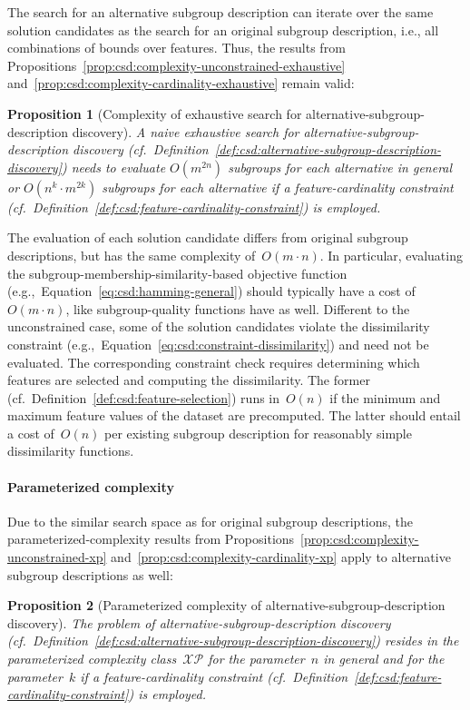 \documentclass{article}
\newtheorem{proposition}{Proposition}
\theoremstyle{definition}
\begin{document}
The search for an alternative subgroup description can iterate over the same solution candidates as the search for an original subgroup description, i.e., all combinations of bounds over features.
Thus, the results from Propositions~\ref{prop:csd:complexity-unconstrained-exhaustive} and~\ref{prop:csd:complexity-cardinality-exhaustive} remain valid:
%
\begin{proposition}[Complexity of exhaustive search for alternative-subgroup-description discovery]
	A naive exhaustive search for alternative-subgroup-descrip\-tion discovery (cf.~Definition~\ref{def:csd:alternative-subgroup-description-discovery})
	needs to evaluate $O(m^{2n})$ subgroups for each alternative in general or $O(n^k \cdot m^{2k})$ subgroups for each alternative if a feature-cardinality constraint (cf.~Definition~\ref{def:csd:feature-cardinality-constraint}) is employed.
	\label{prop:csd:complexity-alternatives-exhaustive}
\end{proposition}
%
The evaluation of each solution candidate differs from original subgroup descriptions, but has the same complexity of~$O(m \cdot n)$.
In particular, evaluating the subgroup-membership-similarity-based objective function (e.g.,~Equation~\ref{eq:csd:hamming-general}) should typically have a cost of~$O(m \cdot n)$, like subgroup-quality functions have as well.
Different to the unconstrained case, some of the solution candidates violate the dissimilarity constraint (e.g.,~Equation~\ref{eq:csd:constraint-dissimilarity}) and need not be evaluated.
The corresponding constraint check requires determining which features are selected and computing the dissimilarity.
The former (cf.~Definition~\ref{def:csd:feature-selection}) runs in~$O(n)$ if the minimum and maximum feature values of the dataset are precomputed.
The latter should entail a cost of~$O(n)$ per existing subgroup description for reasonably simple dissimilarity functions.

\paragraph{Parameterized complexity}

Due to the similar search space as for original subgroup descriptions, the parameterized-complexity results from Propositions~\ref{prop:csd:complexity-unconstrained-xp} and~\ref{prop:csd:complexity-cardinality-xp} apply to alternative subgroup descriptions as well:
\begin{proposition}[Parameterized complexity of alternative-subgroup-description discovery]
	The problem of alternative-subgroup-description discovery (cf.~Definition~\ref{def:csd:alternative-subgroup-description-discovery}) resides in the parameterized complexity class~$\mathcal{XP}$ for the parameter~$n$ in general and for the parameter~$k$ if a feature-cardinality constraint (cf.~Definition~\ref{def:csd:feature-cardinality-constraint}) is employed.
	\label{prop:csd:complexity-alternatives-xp}
\end{proposition}
\end{document}
